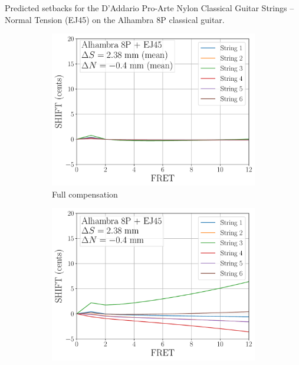  \begin{table}%
  \centering
  \caption{\label{tbl:ej45_setbacks} Predicted setbacks for the D'Addario Pro-Arte Nylon Classical Guitar Strings -- Normal Tension (EJ45) on the Alhambra 8P classical guitar.}
  
 \end{table}%

 \begin{figure}
  \centering
  \begin{subfigure}[b]{0.8\textwidth}
   \centering
   \includegraphics[width=5.0in]{../figures/shift_alhambra8p_ej45_full}
   \caption{Full compensation}
   \label{fig:shift_alhambra8p_ej45_full}
  \end{subfigure}
  \par\vspace{0.25in}
  \begin{subfigure}[b]{0.8\textwidth}
   \centering
   \includegraphics[width=5.0in]{../figures/shift_alhambra8p_ej45_mean}

\end{subfigure}
\end{figure}
